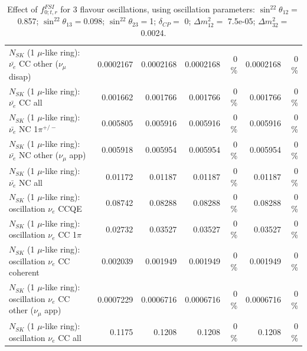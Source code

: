 \begin{table}
\begin{tabular}{| l | r | r | r  r | r  r |}
          $N_{SK}$ (1 $\mu$-like ring): $\bar{\nu_e}$ CC other ($\nu_\mu$ disap) &       0.0002167 &       0.0002168 &       0.0002168 &        0 \%  &       0.0002168 &        0 \%  \\ 
                            $N_{SK}$ (1 $\mu$-like ring): $\bar{\nu_{e}}$ CC all &        0.001662 &        0.001766 &        0.001766 &        0 \%  &        0.001766 &        0 \%  \\ 
\hline
                     $N_{SK}$ (1 $\mu$-like ring): $\bar{\nu_e}$ NC 1$\pi^{+/-}$ &        0.005805 &        0.005916 &        0.005916 &        0 \%  &        0.005916 &        0 \%  \\ 
            $N_{SK}$ (1 $\mu$-like ring): $\bar{\nu_e}$ NC other ($\nu_\mu$ app) &        0.005918 &        0.005954 &        0.005954 &        0 \%  &        0.005954 &        0 \%  \\ 
                            $N_{SK}$ (1 $\mu$-like ring): $\bar{\nu_{e}}$ NC all &         0.01172 &         0.01187 &         0.01187 &        0 \%  &         0.01187 &        0 \%  \\ 
\hline
\hline
\hline
                          $N_{SK}$ (1 $\mu$-like ring): oscillation $\nu_e$ CCQE &         0.08742 &         0.08288 &         0.08288 &        0 \%  &         0.08288 &        0 \%  \\ 
                     $N_{SK}$ (1 $\mu$-like ring): oscillation $\nu_e$ CC 1$\pi$ &         0.02732 &         0.03527 &         0.03527 &        0 \%  &         0.03527 &        0 \%  \\ 
                   $N_{SK}$ (1 $\mu$-like ring): oscillation $\nu_e$ CC coherent &        0.002039 &        0.001949 &        0.001949 &        0 \%  &        0.001949 &        0 \%  \\ 
      $N_{SK}$ (1 $\mu$-like ring): oscillation $\nu_e$ CC other ($\nu_\mu$ app) &       0.0007229 &       0.0006716 &       0.0006716 &        0 \%  &       0.0006716 &        0 \%  \\ 
                       $N_{SK}$ (1 $\mu$-like ring): oscillation $\nu_e$  CC all &          0.1175 &          0.1208 &          0.1208 &        0 \%  &          0.1208 &        0 \%  \\ 
\hline
\hline
\end{tabular}
\caption{ Effect of $f_{0; t, r}^{FSI}$ for 3 flavour oscillations, using oscillation parameters:  $\sin^22\theta_{12} = $0.857; $\sin^22\theta_{13} = $0.098; $\sin^22\theta_{23} = $1; $\delta_{CP} = $        0; $\Delta m^2_{12} = $    7.5e-05; $\Delta m^2_{32} = $    0.0024. }
\label{tab:num_fsi_000_1RmuT_3f_osc_t13:0.098_spectralreco_spectraltrue}
\end{table}
